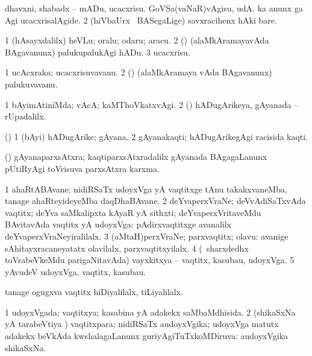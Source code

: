 \bentry
{} 
\gl{\sakirx}
\expl{}
\bmng
\bnum
{} 
\banum
{} dhavxni, shabadx -- mADu, ucacxrisu. 
 GoVSa(vaNaR)vAgisu, udA.  ka anunx ga Agi ucacxrisalAgide. 
\eanum
\numie
\num{2} (hiVbaUrx \mo\ BASegaLige) savxracihenx hAki bare. 
\enum
\emng

\noindent 
\gl{\akirx}
\expl{}
\bmng
\bnum
\num{1} (hAsayxdalilx) heVLu; oralu; odaru; aracu. 
\num{2} (\saM) (alaMkAramayavAda BAgavanunx) palukupalukAgi hADu. 
\num{3} ucacxrisu. 
\enum
\emng
\eentry

\bentry
{} 
\gl{\nA}
\expl{}
\bmng
\bnum
\num{1} ucAcxraka; ucacxrisuvavanu. 
\num{2} (\saM) (alaMkAramaya vAda BAgavanunx) palukuvavanu. 
\enum
\emng
\eentry

\bentry
{} 
\gl{\kirxvi}
\expl{}
\bmng
\bnum
\num{1} bAyimAtiniMda; vAcA; kaMThoVkatxvAgi. 
\num{2} (\saM) hADugArikeya, gAyanada -- rUpadalilx. 
\enum
\emng
\eentry

\bentry
{}
\gl{\nA}
\expl{}
\bmng
 (\saM) 
\bnum
\num{1} (bAyi) hADugArike; gAyana. 
\num{2} gAyanakaqti; hADugArikegAgi racisida kaqti. 
\enum
\emng
\eentry

\bentry
{}
\gl{\nA}
\expl{}
\bmng
 (\saM) gAyanaparxsAtxra; kaqtiparxsAtxradalilx gAyanada BAgagaLanunx pUtiRyAgi toVrisuva parxsAtxra karxma. 
\emng
\eentry

\bentry
{} 
\gl{\nA}
\expl{}
\bmng
\bnum
\num{1} ahaRtABAvane; nidiRSaTx udoyxVga yA vaqtitxge tAnu takakxvaneMba, tanage ahaRteyideyeMba daqDhaBAvane. 
\num{2} deYvaperxVraNe; deVvAdiSaTxvAda vaqtitx; deYva saMkalipxta kAyaR yA sithxti; deYvaperxVritaveMdu BAvitavAda vaqtitx yA udoyxVga:  pAdirxvaqtitxge avanalilx deYvaperxVraNeyiralilalx. 
\num{3} (aMtaH)perxVraNe; parxvaqtitx; olavu:  avanige sAhitayxracaneyatatx olavilalx, parxvaqtitxyilalx. 
\num{4} (\kanmu\ sharxdedhx toVrabeVkeMdu parigaNitavAda) vayxkitxya -- vaqtitx, kasubau, udoyxVga. 
\num{5} yAvudeV udoyxVga, vaqtitx, kasubau. 
\enum
\emng

\noindent 
\gl{\pagu}
\expl{}
\bmng
  tanage ogugxva vaqtitx hiDiyalilalx, tiLiyalilalx. 
\emng
\eentry

\bentry 
{} 
\gl{\gu}
\expl{}
\bmng
\bnum
\num{1} udoyxVgada; vaqtitxya; kasabina yA adakekx saMbaMdhisida. 
\num{2} (shikaSxNa yA tarabeVtiya \vi) vaqtitxpara; nidiRSaTx audoyxVgika; udoyxVga matutx adakekx beVkAda kwshalagaLanunx guriyAgiTuTxkoMDiruva:  audoyxVgika shikaSxNa. 
\enum
\emng
\eentry


